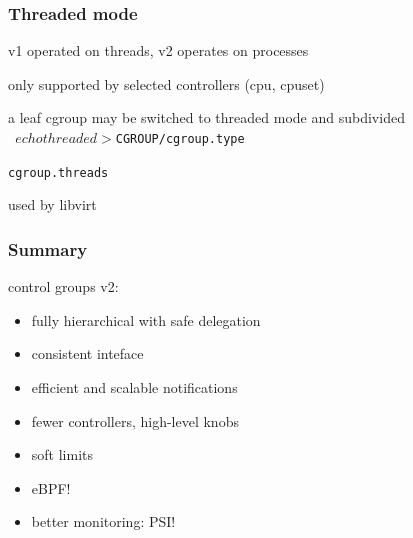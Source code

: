 \documentclass[serif]{beamer}
\begin{document}
\begin{frame}[fragile]
  \frametitle{Threaded mode}

  \pause

  v1 operated on threads, v2 operates on processes
  \medskip\pause

  only supported by selected controllers (cpu, cpuset)
  \medskip\pause

  a leaf cgroup may be switched to threaded mode and subdivided\\
  \texttt{        $ echo threaded > $CGROUP/cgroup.type}\\
  \pause

  \texttt{cgroup.threads}
  \medskip\pause

  used by libvirt
\end{frame}

\begin{frame}
  \frametitle{Summary}

  control groups v2:
  \begin{itemize}
  \item fully hierarchical with safe delegation
  \item consistent inteface
  \item efficient and scalable notifications
  \item fewer controllers, high-level knobs
  \item soft limits
  \item eBPF!
  \item better monitoring: PSI!
  \end{itemize}
\end{frame}
\end{document}
